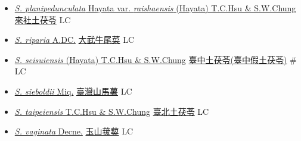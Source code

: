 \begin{itemize}
\begin{itemize}
        \item[] \href{http://www.theplantlist.org/tpl1.1/search?q=Smilax+planipedunculata+var.+raishaensis}{\textit{S. planipedunculata} Hayata var. \textit{raishaensis} (Hayata) T.C.Hsu \& S.W.Chung}   \href{\detokenize{http://taibnet.sinica.edu.tw/chi/taibnet_species_list.php?T2=來社土茯苓&T2_new_value=true&fr=y}}{來社土茯苓} LC
        \item[] \href{http://www.theplantlist.org/tpl1.1/search?q=Smilax+riparia}{\textit{S. riparia} A.DC.}   \href{\detokenize{http://taibnet.sinica.edu.tw/chi/taibnet_species_list.php?T2=大武牛尾菜&T2_new_value=true&fr=y}}{大武牛尾菜} LC
        \item[] \href{http://www.theplantlist.org/tpl1.1/search?q=Smilax+seisuiensis}{\textit{S. seisuiensis} (Hayata) T.C.Hsu \& S.W.Chung}     \href{\detokenize{http://taibnet.sinica.edu.tw/chi/taibnet_species_list.php?T2=臺中土茯苓&T2_new_value=true&fr=y}}{臺中土茯苓(臺中假土茯苓)}  \# LC
        \item[] \href{http://www.theplantlist.org/tpl1.1/search?q=Smilax+sieboldii}{\textit{S. sieboldii} Miq.}   \href{\detokenize{http://taibnet.sinica.edu.tw/chi/taibnet_species_list.php?T2=臺灣山馬薯&T2_new_value=true&fr=y}}{臺灣山馬薯} LC
        \item[] \href{http://www.theplantlist.org/tpl1.1/search?q=Smilax+taipeiensis}{\textit{S. taipeiensis} T.C.Hsu \& S.W.Chung}   \href{\detokenize{http://taibnet.sinica.edu.tw/chi/taibnet_species_list.php?T2=臺北土茯苓&T2_new_value=true&fr=y}}{臺北土茯苓} LC
        \item[] \href{http://www.theplantlist.org/tpl1.1/search?q=Smilax+vaginata}{\textit{S. vaginata} Decne.}   \href{\detokenize{http://taibnet.sinica.edu.tw/chi/taibnet_species_list.php?T2=玉山菝葜&T2_new_value=true&fr=y}}{玉山菝葜} LC
  \end{itemize}
  \end{itemize}
